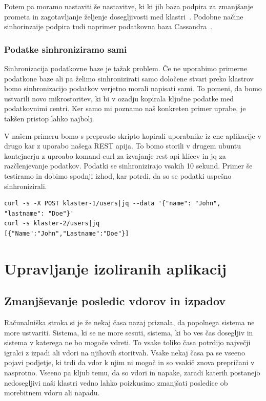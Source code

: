 \documentclass[a4paper, 12pt]{book}
\begin{document}
Potem pa moramo nastaviti še nastavitve, ki ki jih baza podpira za zmanjšanje prometa in zagotavljanje željenje dosegljivosti med klastri~\cite{cratedb-zone}.
Podobne načine sinhorinzaije podpira tudi naprimer podatkovna baza Cassandra~\cite{cassandra-zone}.
\subsection{Podatke sinhroniziramo sami}
Sinhronizacija podatkovne baze je tažak problem.
Če ne uporabimo primerne podatkone baze ali pa želimo sinhronizirati samo določene stvari preko klastrov bomo sinhronizacijo podatkov verjetno morali napisati sami.
To pomeni, da bomo ustvarili novo mikrostoritev, ki bi v ozadju kopirala ključne podatke med podatkovnimi centri.
Ker samo mi poznamo naš konkreten primer uprabe, je takšen pristop lahko najbolj.

V našem primeru bomo s preprosto skripto kopirali uporabnike iz ene aplikacije v drugo kar z uporabo našega REST apija.
To bomo storili v drugem ubuntu kontejnerju z uproabo komand curl za izvajanje rest api klicev in jq za razčlenjevanje podatkov.
Podatki se sinhronizirajo vsakih 10 sekund.
Primer še testiramo in dobimo spodnji izhod, kar potrdi, da so se podatki uspešno sinhronizirali.
\begin{verbatim}
curl -s -X POST klaster-1/users|jq --data '{"name": "John", "lastname": "Doe"}'
curl -s klaster-2/users|jq
[{"Name":"John","Lastname":"Doe"}]
\end{verbatim}
\chapter{Upravljanje izoliranih aplikacij}
\section{Zmanjševanje posledic vdorov in izpadov}
Računalniška stroka si je že nekaj časa nazaj priznala, da popolnega sistema ne more ustvariti.
Sistema, ki se ne more sesuti, sistema, ki bo ves čas dosegljiv in sistema v katerega ne bo mogoče vdreti.
To vsake toliko časa potrdijo največji igralci z izpadi ali vdori na njihovih storitvah. 
Vsake nekaj časa pa se vseeno pojavi podjetje, ki trdi da vdor k njim ni mogoč in so vsakič znova prepričani v nasprotno.
Vseeno pa kljub temu, da so vdori in napake, zaradi katerih postanejo nedosegljivi naši klastri vedno lahko poizkusimo zmanjšati posledice ob morebitnem vdoru ali napadu. 
\end{document}
